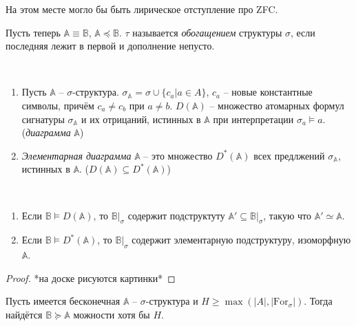 \begin{remark}
    На этом месте могло бы быть лирическое отступление про ZFC. 
\end{remark}

Пусть теперь $\mathbb{A} \equiv \mathbb{B}$, $\mathbb{A} \preceq \mathbb{B}$. $\tau$ называется \textit{обогащением} структуры $\sigma$, если последняя лежит в первой и дополнение непусто.

\begin{definition} \

    \begin{enumerate}
        \item Пусть $\mathbb{A}$ -- $\sigma$-структура. $\sigma_{\mathbb{A}} = \sigma \cup \{c_a | a \in A\}$, $c_a$ -- новые константные символы, причём $c_a \neq c_b$ при $a \neq b$. $D(\mathbb{A})$ -- множество атомарных формул сигнатуры $\sigma_{\mathbb{A}}$ и их отрицаний, истинных в $\mathbb{A}$ при интерпретации $\sigma_a \models a$. (\textit{диаграмма} $\mathbb{A}$) 
        \item \textit{Элементарная диаграмма} $\mathbb{A}$ -- это множество $D^*(\mathbb{A})$ всех предлжений $\sigma_{\mathbb{A}}$, истинных в $\mathbb{A}$. ($D(\mathbb{A}) \subseteq D^*(\mathbb{A})$)
    \end{enumerate}
\end{definition}

\begin{stat} \ 

    \begin{enumerate}
        \item Если $\mathbb{B} \models D(\mathbb{A})$, то $\mathbb{B}|_{\sigma}$ содержит подструктуту $\mathbb{A}' \subseteq \mathbb{B}|_{\sigma}$, такую что $\mathbb{A}' \simeq \mathbb{A}$. 
        \item Если $\mathbb{B} \models D^*(\mathbb{A})$, то $\mathbb{B}|_{\sigma}$ содержит элементарную подструктуру, изоморфную $\mathbb{A}$. 
    \end{enumerate}
\end{stat}

\begin{proof}
    *на доске рисуются картинки*
\end{proof} 

\begin{theorem}
    Пусть имеется бесконечная $\mathbb{A}$ -- $\sigma$-структура и $H \geq \max(|A|, |\text{For}_\sigma|)$. Тогда найдётся $\mathbb{B} \succeq \mathbb{A}$ можности хотя бы $H$.
\end{theorem}

